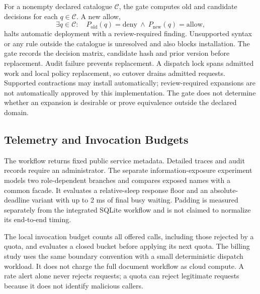 \documentclass[11pt,a4paper]{article}
\begin{document}
For a nonempty declared catalogue $\mathcal{C}$, the gate computes old and candidate decisions for each $q\in\mathcal{C}$. A new allow,
\[
\exists q\in\mathcal{C}:\quad P_{\mathrm{old}}(q)=\mathrm{deny}\ \land\ P_{\mathrm{new}}(q)=\mathrm{allow},
\]
halts automatic deployment with a review-required finding. Unsupported syntax or any rule outside the catalogue is unresolved and also blocks installation. The gate records the decision matrix, candidate hash and prior version before replacement. Audit failure prevents replacement. A dispatch lock spans admitted work and local policy replacement, so cutover drains admitted requests. Supported contractions may install automatically; review-required expansions are not automatically approved by this implementation. The gate does not determine whether an expansion is desirable or prove equivalence outside the declared domain.

\subsection{Telemetry and Invocation Budgets}
The workflow returns fixed public service metadata. Detailed traces and audit records require an administrator. The separate information-exposure experiment models two role-dependent branches and compares exposed names with a common facade. It evaluates a relative-sleep response floor and an absolute-deadline variant with up to 2 ms of final busy waiting. Padding is measured separately from the integrated SQLite workflow and is not claimed to normalize its end-to-end timing.

The local invocation budget counts all offered calls, including those rejected by a quota, and evaluates a closed bucket before applying its next quota. The billing study uses the same boundary convention with a small deterministic dispatch workload. It does not charge the full document workflow as cloud compute. A rate alert alone never rejects requests; a quota can reject legitimate requests because it does not identify malicious callers.
\end{document}

